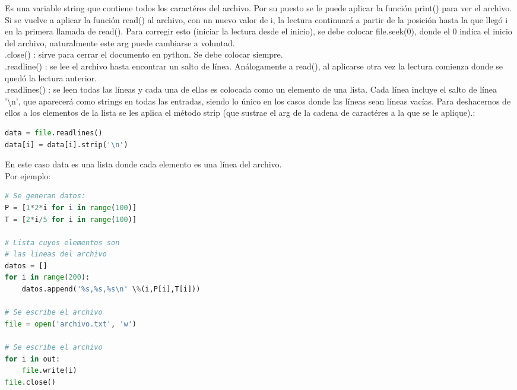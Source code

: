\documentclass[10pt,oneside]{article}
\begin{document}
\begin{multicols}{2}
            Es una variable string que contiene todos los caractéres del archivo. Por su puesto se le puede aplicar la función print() para ver el archivo. \\ \newline Si se vuelve a aplicar la función read() al archivo, con un nuevo valor de i, la lectura continuará a partir de la posición hasta la que llegó i en la primera llamada de read(). Para corregir esto (iniciar la lectura desde el inicio), se debe colocar file.seek(0), donde el 0 indica el inicio del archivo, naturalmente este arg puede cambiarse a voluntad.\\ \newline .close() : sirve para cerrar el documento en python. Se debe colocar siempre.\\ \newline .readline() : se lee el archivo hasta encontrar un salto de línea. Análogamente a read(), al aplicarse otra vez la lectura comienza donde se quedó la lectura anterior.\\ \newline .readlines() : se leen todas las líneas y cada una de ellas es colocada como un elemento de una lista. Cada línea incluye el salto de línea '\textbackslash{n}', que aparecerá como strings en todas las entradas, siendo lo único en los casos donde las líneas sean líneas vacías. Para deshacernos de ellos a los elementos de la lista se les aplica el método strip (que sustrae el arg de la cadena de caractéres a la que se le aplique).:

            \begin{lstlisting}[language=Python]
data = file.readlines()
data[i] = data[i].strip('\n')
            \end{lstlisting}

        En este caso data es una lista donde cada elemento es una línea del archivo.\\ \newline Por ejemplo:

            \begin{lstlisting}[language=Python]
# Se generan datos:
P = [1*2*i for i in range(100)]
T = [2*i/5 for i in range(100)]

# Lista cuyos elementos son
# las lineas del archivo
datos = []
for i in range(200):
    datos.append('%s,%s,%s\n' \%(i,P[i],T[i]))

# Se escribe el archivo
file = open('archivo.txt', 'w')   

# Se escribe el archivo       
for i in out:                                                                 
    file.write(i)
file.close()     
            \end{lstlisting}


\end{multicols}
\end{document}
